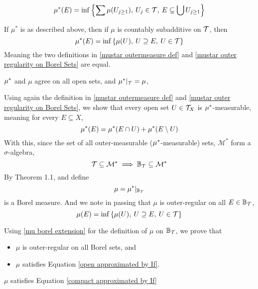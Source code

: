 \documentclass[../../main.tex]{subfiles}
\begin{document}
\begin{enumalpha}
    \begin{equation}\label{mustar outermeasure def}
        \mu^*(E)= \inf\left\{\sum \mu(U_{j\geq 1}),\:U_j\in\mathcal{T},\:E\subseteq\bigcup U_{j\geq 1}\right\}
    \end{equation}
    \label{7.2.c}
%    
%    
    \item If $\mu^*$ is as described above, then if $\mu$ is countably subadditive on $\mathcal{T}$, then
    \begin{equation}\label{mustar outer regularity on Borel Sets}
        \mu^*(E) = \inf\left\{\mu(U),\:U\supseteq E,\: U\in\mathcal{T}\right\} 
    \end{equation}
    Meaning the two definitions in \eqref{mustar outermeasure def} and \eqref{mustar outer regularity on Borel Sets} are equal.
    \label{7.2.d}
%
%
    \item $\mu^*$ and $\mu$ agree on all open sets, and $\mu^*|_{\mathcal{T}} = \mu$, 
    \label{7.2.e}
%
%    
    \item Using again the definition in \eqref{mustar outermeasure def} and \eqref{mustar outer regularity on Borel Sets}, we show that every open set $U\in\mathcal{T}_X$ is $\mu^*$-measurable, meaning for every $E\subseteq X$,
    \[
    \mu^*(E) = \mu^*(E\cap U) + \mu^*(E\setminus U)
    \]
    With this, since the set of all outer-measurable ($\mu^*$-measurable) sets, $\mathcal{M}^*$ form a $\sigma$-algebra, 
    \[
    \mathcal{T}\subseteq \mathcal{M}^*\implies \mathbb{B}_{\mathcal{T}}\subseteq\mathcal{M}^*
    \]
    By Theorem 1.1, and define 
    \begin{equation}\label{mu borel extension}
        \mu = \mu^*|_{\mathbb{B}_{\mathcal{T}}}
    \end{equation} 
    is a Borel measure. And we note in passing that $\mu$ is outer-regular on all $E\in\mathbb{B}_{\mathcal{T}}$,
    \begin{equation}\label{mu outer-regular on all Borel}
         \mu(E) = \inf\left\{\mu(U),\:U\supseteq E,\: U\in\mathcal{T}\right\} 
    \end{equation}
    \label{7.2.f}
%
%
    \item Using \eqref{mu borel extension} for the definition of  $\mu$ on $\mathbb{B}_{\mathcal{T}}$, we prove that
    \begin{itemize}
        \item $\mu$ is outer-regular on all Borel sets, and
        \item $\mu$ satisfies Equation \eqref{open approximated by If}.
    \end{itemize}
    \label{7.2.g}
%
%
    \item $\mu$ satisfies Equation \eqref{compact approximated by If}

\end{enumalpha}
\end{document}
